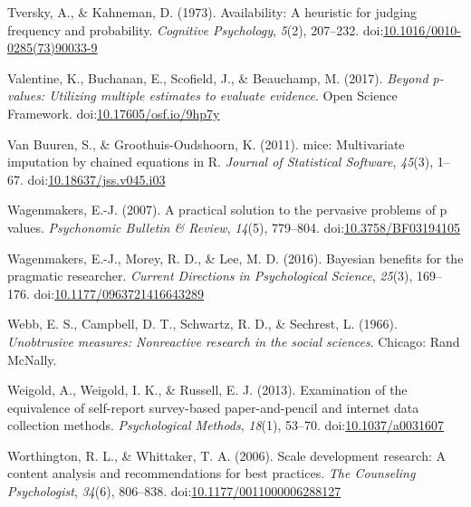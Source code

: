\documentclass[english,man]{apa6}
\theoremstyle{definition}
\theoremstyle{definition}
\theoremstyle{definition}
\theoremstyle{remark}
\begin{document}
\hypertarget{ref-Tversky1973}{}
Tversky, A., \& Kahneman, D. (1973). Availability: A heuristic for
judging frequency and probability. \emph{Cognitive Psychology},
\emph{5}(2), 207--232.
doi:\href{https://doi.org/10.1016/0010-0285(73)90033-9}{10.1016/0010-0285(73)90033-9}

\hypertarget{ref-Valentine2017}{}
Valentine, K., Buchanan, E., Scofield, J., \& Beauchamp, M. (2017).
\emph{Beyond p-values: Utilizing multiple estimates to evaluate
evidence}. Open Science Framework.
doi:\href{https://doi.org/10.17605/osf.io/9hp7y}{10.17605/osf.io/9hp7y}

\hypertarget{ref-VanBuuren2011}{}
Van Buuren, S., \& Groothuis-Oudshoorn, K. (2011). mice: Multivariate
imputation by chained equations in R. \emph{Journal of Statistical
Software}, \emph{45}(3), 1--67.
doi:\href{https://doi.org/10.18637/jss.v045.i03}{10.18637/jss.v045.i03}

\hypertarget{ref-Wagenmakers2007}{}
Wagenmakers, E.-J. (2007). A practical solution to the pervasive
problems of p values. \emph{Psychonomic Bulletin \& Review},
\emph{14}(5), 779--804.
doi:\href{https://doi.org/10.3758/BF03194105}{10.3758/BF03194105}

\hypertarget{ref-Wagenmakers2016}{}
Wagenmakers, E.-J., Morey, R. D., \& Lee, M. D. (2016). Bayesian
benefits for the pragmatic researcher. \emph{Current Directions in
Psychological Science}, \emph{25}(3), 169--176.
doi:\href{https://doi.org/10.1177/0963721416643289}{10.1177/0963721416643289}

\hypertarget{ref-Webb1966}{}
Webb, E. S., Campbell, D. T., Schwartz, R. D., \& Sechrest, L. (1966).
\emph{Unobtrusive measures: Nonreactive research in the social
sciences}. Chicago: Rand McNally.

\hypertarget{ref-Weigold2013}{}
Weigold, A., Weigold, I. K., \& Russell, E. J. (2013). Examination of
the equivalence of self-report survey-based paper-and-pencil and
internet data collection methods. \emph{Psychological Methods},
\emph{18}(1), 53--70.
doi:\href{https://doi.org/10.1037/a0031607}{10.1037/a0031607}

\hypertarget{ref-Worthington2006}{}
Worthington, R. L., \& Whittaker, T. A. (2006). Scale development
research: A content analysis and recommendations for best practices.
\emph{The Counseling Psychologist}, \emph{34}(6), 806--838.
doi:\href{https://doi.org/10.1177/0011000006288127}{10.1177/0011000006288127}
\end{document}
